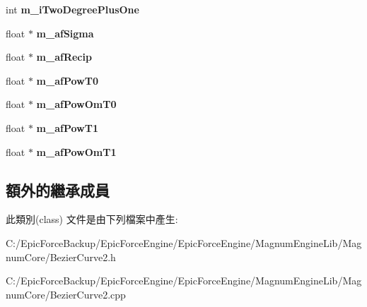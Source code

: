 \begin{DoxyCompactItemize}
\item 
int {\bfseries m\+\_\+i\+Two\+Degree\+Plus\+One}\hypertarget{class_magnum_1_1_bezier_curve2_ab6c521a0557f9314f33ca2f11325c7f5}{}\label{class_magnum_1_1_bezier_curve2_ab6c521a0557f9314f33ca2f11325c7f5}

\item 
float $\ast$ {\bfseries m\+\_\+af\+Sigma}\hypertarget{class_magnum_1_1_bezier_curve2_abe196a53d5f4530ff90ad6dcf1b9a5f8}{}\label{class_magnum_1_1_bezier_curve2_abe196a53d5f4530ff90ad6dcf1b9a5f8}

\item 
float $\ast$ {\bfseries m\+\_\+af\+Recip}\hypertarget{class_magnum_1_1_bezier_curve2_a135f27cdcbfa8a48171044c2b7918ca7}{}\label{class_magnum_1_1_bezier_curve2_a135f27cdcbfa8a48171044c2b7918ca7}

\item 
float $\ast$ {\bfseries m\+\_\+af\+Pow\+T0}\hypertarget{class_magnum_1_1_bezier_curve2_a88b1f790186ec98b56ba6ccff9fed345}{}\label{class_magnum_1_1_bezier_curve2_a88b1f790186ec98b56ba6ccff9fed345}

\item 
float $\ast$ {\bfseries m\+\_\+af\+Pow\+Om\+T0}\hypertarget{class_magnum_1_1_bezier_curve2_afae39613e4d1578b26b5915de8349320}{}\label{class_magnum_1_1_bezier_curve2_afae39613e4d1578b26b5915de8349320}

\item 
float $\ast$ {\bfseries m\+\_\+af\+Pow\+T1}\hypertarget{class_magnum_1_1_bezier_curve2_a4fb4722e72034443d57660e35b040708}{}\label{class_magnum_1_1_bezier_curve2_a4fb4722e72034443d57660e35b040708}

\item 
float $\ast$ {\bfseries m\+\_\+af\+Pow\+Om\+T1}\hypertarget{class_magnum_1_1_bezier_curve2_a0d6636237c2c6d4489e5ffb25508692c}{}\label{class_magnum_1_1_bezier_curve2_a0d6636237c2c6d4489e5ffb25508692c}

\end{DoxyCompactItemize}
\subsection*{額外的繼承成員}


此類別(class) 文件是由下列檔案中產生\+:\begin{DoxyCompactItemize}
\item 
C\+:/\+Epic\+Force\+Backup/\+Epic\+Force\+Engine/\+Epic\+Force\+Engine/\+Magnum\+Engine\+Lib/\+Magnum\+Core/Bezier\+Curve2.\+h\item 
C\+:/\+Epic\+Force\+Backup/\+Epic\+Force\+Engine/\+Epic\+Force\+Engine/\+Magnum\+Engine\+Lib/\+Magnum\+Core/Bezier\+Curve2.\+cpp\end{DoxyCompactItemize}
